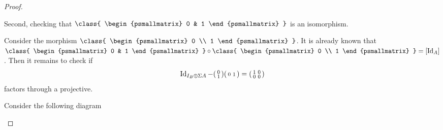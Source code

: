 \begin{proof}
\begin{enumerate}[label={(\bfseries TR\arabic*)}]
{            Second, checking that \( \class{
                \begin{psmallmatrix}
                    0 & 1
                \end{psmallmatrix}
            } \) is an isomorphism.

            Consider the morphism \( \class{
                \begin{psmallmatrix}
                    0 \\
                    1
                \end{psmallmatrix}
            } \).
            It is already known that \( \class{
                \begin{psmallmatrix}
                    0 & 1
                \end{psmallmatrix}
            } \circ \class{
                \begin{psmallmatrix}
                    0 \\
                    1
                \end{psmallmatrix}
            } = [\Id_A] \).
            Then it remains to check if
            \[
                \operatorname{Id}_{I_B \oplus \Sigma A} -
                \begin{psmallmatrix}
                    0 \\
                    1
                \end{psmallmatrix}
                \begin{psmallmatrix}
                    0 & 1
                \end{psmallmatrix}
                =
                \begin{psmallmatrix}
                    1 & 0 \\
                    0 & 0
                \end{psmallmatrix}
            \]
            factors through a projective.

            Consider the following diagram
            \begin{center}
\end{center}}
\end{enumerate}
\end{proof}

